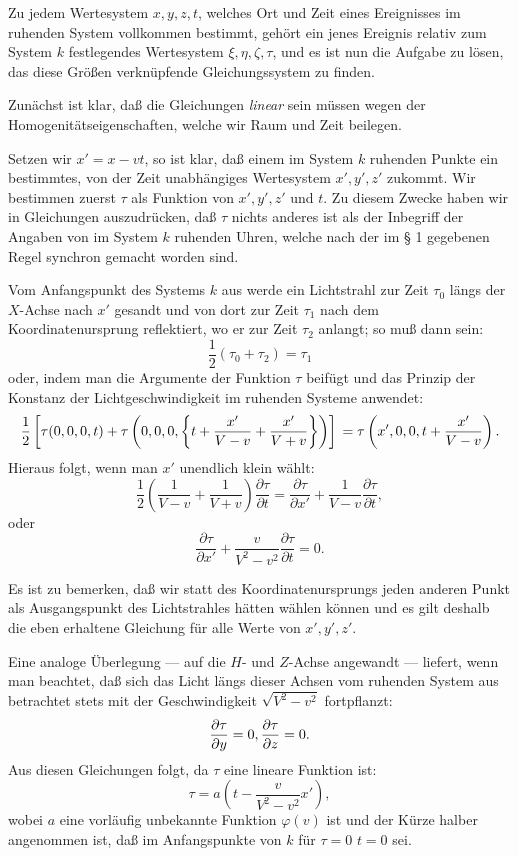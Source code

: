 \documentclass[17pt]{webarticle}       %
\begin{document}
Zu jedem Wertesystem \( x, y, z, t \), welches Ort und Zeit eines Ereignisses im ruhenden System vollkommen bestimmt, gehört ein jenes Ereignis relativ zum System \( k \) festlegendes Wertesystem \( \xi, \eta, \zeta, \tau \), und es ist nun die Aufgabe zu lösen, das diese Größen verknüpfende Gleichungssystem zu finden.

Zunächst ist klar, daß die Gleichungen \emph{linear} sein müssen wegen der Homogenitätseigenschaften, welche wir Raum und Zeit beilegen.

Setzen wir \( x' = x - vt \), so ist klar, daß einem im System \( k \) ruhenden Punkte ein bestimmtes, von der Zeit unabhängiges Wertesystem \( x', y', z' \) zukommt. Wir bestimmen zuerst \( \tau \) als Funktion von \( x', y', z' \) und \( t \). Zu diesem Zwecke haben wir in Gleichungen auszudrücken, daß \( \tau \) nichts anderes ist als der Inbegriff der Angaben von im System \( k \) ruhenden Uhren, welche nach der im § 1 gegebenen Regel synchron gemacht worden sind.

Vom Anfangspunkt des Systems \( k \) aus werde ein Lichtstrahl zur Zeit \( \tau_0 \) längs der \( X \)-Achse nach \( x' \) gesandt und von dort zur Zeit \( \tau_1 \) nach dem Koordinatenursprung reflektiert, wo er zur Zeit \( \tau_2 \) anlangt; so muß dann sein:
\[
\frac{1}{2} (\tau_0 + \tau_2) = \tau_1
\]
oder, indem man die Argumente der Funktion \( \tau \) beifügt und das Prinzip der Konstanz der Lichtgeschwindigkeit im ruhenden Systeme anwendet:
\[
\frac{1}{2} \left[ \tau(0,0,0,t) + \tau \left(0,0,0, \left\{ t + \frac{x'}{V-v} + \frac{x'}{V+v} \right\} \right) \right]
\\
= \tau \left(x',0,0,t + \frac{x'}{V-v} \right) .
\]
Hieraus folgt, wenn man \( x' \) unendlich klein wählt:
\[
\frac{1}{2} \left( \frac{1}{V-v} + \frac{1}{V+v} \right) \frac{\partial \tau}{\partial t} = \frac{\partial \tau}{\partial x'} + \frac{1}{V-v} \frac{\partial \tau}{\partial t}, 
\]
oder
\[
\frac{\partial \tau}{\partial x'} + \frac{v}{V^2-v^2} \frac{\partial \tau}{\partial t} = 0.
\]

Es ist zu bemerken, daß wir statt des Koordinatenursprungs jeden anderen Punkt als Ausgangspunkt des Lichtstrahles hätten wählen können und es gilt deshalb die eben erhaltene Gleichung für alle Werte von \( x', y', z' \).

Eine analoge Überlegung — auf die \( H \)- und \( Z \)-Achse angewandt — liefert, wenn man beachtet, daß sich das Licht längs dieser Achsen vom ruhenden System aus betrachtet stets mit der Geschwindigkeit \( \sqrt{V^2 - v^2} \) fortpflanzt:
\[
\frac{\partial \tau}{\partial y} = 0 , 
\\
\frac{\partial \tau}{\partial z} = 0 .
\]
Aus diesen Gleichungen folgt, da \( \tau \) eine lineare Funktion ist:
\[
\tau = a \left( t - \frac{v}{V^2 - v^2} x' \right) ,
\]
wobei \( a \) eine vorläufig unbekannte Funktion \( \varphi (v) \) ist und der Kürze halber angenommen ist, daß im Anfangspunkte von \( k \) für \( \tau = 0 \) \( t = 0 \) sei.
\end{document}
